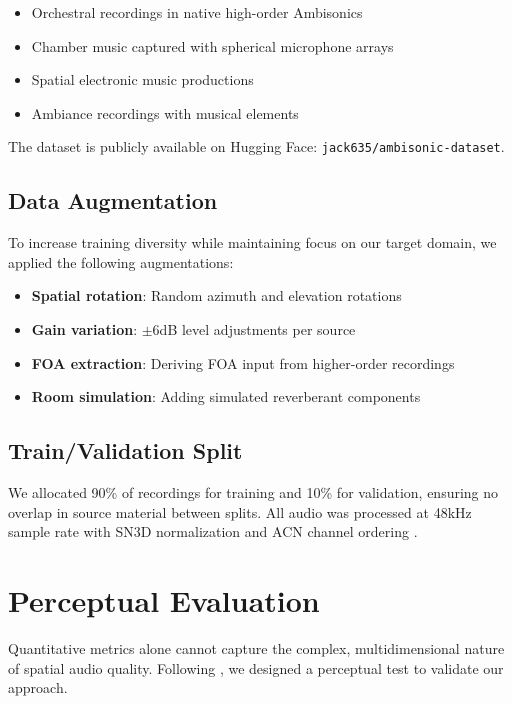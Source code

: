 \documentclass[10pt,twocolumn]{article}
\begin{document}
\begin{itemize}
    \item Orchestral recordings in native high-order Ambisonics
    \item Chamber music captured with spherical microphone arrays
    \item Spatial electronic music productions
    \item Ambiance recordings with musical elements
\end{itemize}

The dataset is publicly available on Hugging Face: \texttt{jack635/ambisonic-dataset}.

\subsection{Data Augmentation}

To increase training diversity while maintaining focus on our target domain, we applied the following augmentations:

\begin{itemize}
    \item \textbf{Spatial rotation}: Random azimuth and elevation rotations
    \item \textbf{Gain variation}: $\pm$6dB level adjustments per source
    \item \textbf{FOA extraction}: Deriving FOA input from higher-order recordings
    \item \textbf{Room simulation}: Adding simulated reverberant components
\end{itemize}

\subsection{Train/Validation Split}

We allocated 90\% of recordings for training and 10\% for validation, ensuring no overlap in source material between splits. All audio was processed at 48kHz sample rate with SN3D normalization and ACN channel ordering \cite{chapman2009standard}.

\section{Perceptual Evaluation}

Quantitative metrics alone cannot capture the complex, multidimensional nature of spatial audio quality. Following \cite{nawfal2025ambisonics}, we designed a perceptual test to validate our approach.
\end{document}
